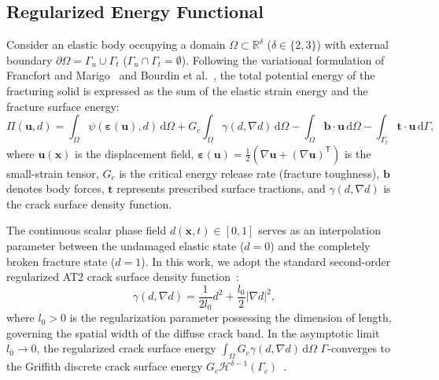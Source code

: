 \subsection{Regularized Energy Functional}
Consider an elastic body occupying a domain $\Omega \subset \mathbb{R}^{\delta}$ ($\delta \in \{2, 3\}$) with external boundary $\partial\Omega = \Gamma_u \cup \Gamma_t$ ($\Gamma_u \cap \Gamma_t = \emptyset$). Following the variational formulation of Francfort and Marigo~\cite{francfort1998} and Bourdin et al.~\cite{bourdin2000}, the total potential energy of the fracturing solid is expressed as the sum of the elastic strain energy and the fracture surface energy:
\begin{equation}
\label{eq:total_energy_functional}
\Pi(\mathbf{u}, d) = \int_{\Omega} \psi(\boldsymbol{\varepsilon}(\mathbf{u}), d) \, \mathrm{d}\Omega + G_c \int_{\Omega} \gamma(d, \nabla d) \, \mathrm{d}\Omega - \int_{\Omega} \mathbf{b} \cdot \mathbf{u} \, \mathrm{d}\Omega - \int_{\Gamma_t} \mathbf{t} \cdot \mathbf{u} \, \mathrm{d}\Gamma,
\end{equation}
where $\mathbf{u}(\mathbf{x})$ is the displacement field, $\boldsymbol{\varepsilon}(\mathbf{u}) = \frac{1}{2}(\nabla\mathbf{u} + (\nabla\mathbf{u})^{\mathsf{T}})$ is the small-strain tensor, $G_c$ is the critical energy release rate (fracture toughness), $\mathbf{b}$ denotes body forces, $\mathbf{t}$ represents prescribed surface tractions, and $\gamma(d, \nabla d)$ is the crack surface density function.

The continuous scalar phase field $d(\mathbf{x}, t) \in [0, 1]$ serves as an interpolation parameter between the undamaged elastic state ($d = 0$) and the completely broken fracture state ($d = 1$). In this work, we adopt the standard second-order regularized AT2 crack surface density function~\cite{bourdin2000,miehe2010a}:
\begin{equation}
\label{eq:crack_surface_density}
\gamma(d, \nabla d) = \frac{1}{2l_0} d^2 + \frac{l_0}{2} |\nabla d|^2,
\end{equation}
where $l_0 > 0$ is the regularization parameter possessing the dimension of length, governing the spatial width of the diffuse crack band. In the asymptotic limit $l_0 \to 0$, the regularized crack surface energy $\int_\Omega G_c \gamma(d, \nabla d)\,\mathrm{d}\Omega$ $\Gamma$-converges to the Griffith discrete crack surface energy $G_c \mathcal{H}^{\delta-1}(\Gamma_c)$~\cite{bourdin2008}.

